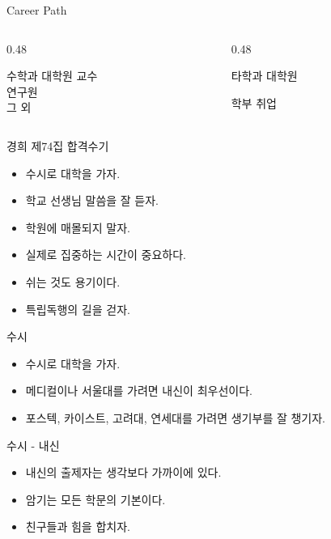 \documentclass[12pt,aspectratio=169]{beamer}
\newenvironment{mainitemize}{\begin{itemize}\setlength{\itemsep}{0.72em}}{\end{itemize}}
\begin{document}
\begin{frame}{Career Path}
\begin{columns}[T,totalwidth=\textwidth]
  \begin{column}{0.48\textwidth}
    \begin{block}{수학과 대학원}
    교수\\연구원\\그 외
    \end{block}
  \end{column}
  \begin{column}{0.48\textwidth}
    \begin{block}{타학과 대학원}
    \vspace{1.8em}
    \end{block}
    \begin{block}{학부 취업}
    \vspace{1.8em}
    \end{block}
  \end{column}
\end{columns}
\end{frame}

\begin{frame}{경희 제74집 합격수기}
\begin{mainitemize}
  \item 수시로 대학을 가자.
  \item 학교 선생님 말씀을 잘 듣자.
  \item 학원에 매몰되지 말자.
  \item 실제로 집중하는 시간이 중요하다.
  \item 쉬는 것도 용기이다.
  \item 특립독행의 길을 걷자.
\end{mainitemize}
\end{frame}

\begin{frame}{수시}
\begin{mainitemize}
  \item 수시로 대학을 가자.
  \item 메디컬이나 서울대를 가려면 내신이 최우선이다.
  \item 포스텍, 카이스트, 고려대, 연세대를 가려면 생기부를 잘 챙기자.
\end{mainitemize}
\end{frame}

\begin{frame}{수시 - 내신}
\begin{mainitemize}
  \item 내신의 출제자는 생각보다 가까이에 있다.
  \item 암기는 모든 학문의 기본이다.
  \item 친구들과 힘을 합치자.
\end{mainitemize}
\end{frame}
\end{document}

